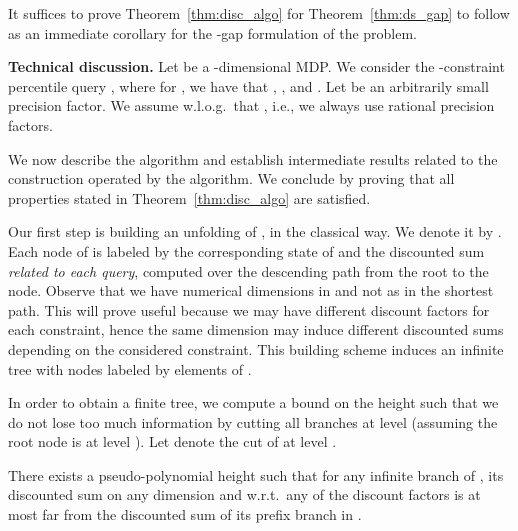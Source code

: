 \documentclass{llncs}
\begin{document}
It suffices to prove Theorem~\ref{thm:disc_algo} for Theorem~\ref{thm:ds_gap} to follow as an immediate corollary for the -gap formulation of the problem.

\smallskip\noindent\textbf{Technical discussion.} Let  be a -dimensional MDP. We consider the -constraint percentile query , where for , we have that , ,  and . Let  be an arbitrarily small precision factor. We assume w.l.o.g.~that , i.e., we always use rational precision factors.
	
We now describe the algorithm and establish intermediate results related to the construction operated by the algorithm. We conclude by proving that all properties stated in Theorem~\ref{thm:disc_algo} are satisfied.

Our first step is building an unfolding of , in the classical way. We denote it by . Each node of  is labeled by the corresponding state of  and the discounted sum \textit{related to each query}, computed over the descending path from the root to the node. Observe that we have  numerical dimensions in  and not  as in the shortest path. This will prove useful because we may have different discount factors for each constraint, hence the same dimension may induce different discounted sums depending on the considered constraint. This building scheme induces an infinite tree  with nodes labeled by elements of .

In order to obtain a finite tree, we compute a bound  on the height such that we do not lose too much information by cutting all branches at level  (assuming the root node is at level ). Let  denote the cut of  at level .

\begin{lemma}
\label{lem:ds_height}
There exists a pseudo-polynomial height  such that for any infinite branch of , its discounted sum on any dimension and w.r.t.~any of the discount factors is at most  far from the discounted sum of its prefix branch in .
\end{lemma}
\end{document}
